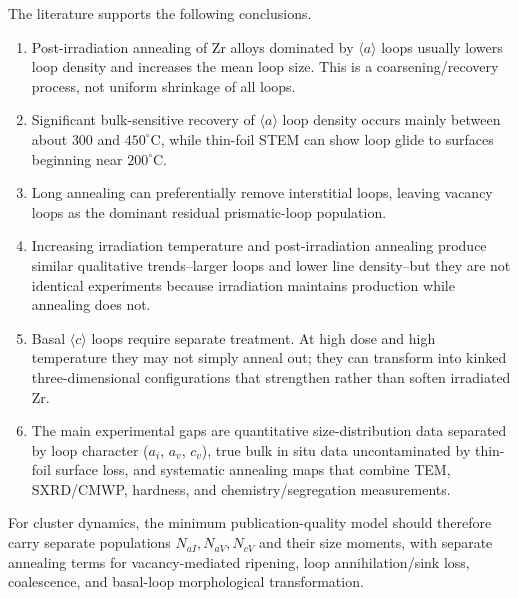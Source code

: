 \documentclass[11pt]{article}
\newcommand{\degreeC}{^\circ\mathrm{C}}
\begin{document}
The literature supports the following conclusions.
\begin{enumerate}[leftmargin=2em]
\item Post-irradiation annealing of Zr alloys dominated by $\langle a\rangle$ loops usually lowers loop density and increases the mean loop size.  This is a coarsening/recovery process, not uniform shrinkage of all loops.
\item Significant bulk-sensitive recovery of $\langle a\rangle$ loop density occurs mainly between about $300$ and $450\degreeC$, while thin-foil STEM can show loop glide to surfaces beginning near $200\degreeC$.
\item Long annealing can preferentially remove interstitial loops, leaving vacancy loops as the dominant residual prismatic-loop population.
\item Increasing irradiation temperature and post-irradiation annealing produce similar qualitative trends--larger loops and lower line density--but they are not identical experiments because irradiation maintains production while annealing does not.
\item Basal $\langle c\rangle$ loops require separate treatment.  At high dose and high temperature they may not simply anneal out; they can transform into kinked three-dimensional configurations that strengthen rather than soften irradiated Zr.
\item The main experimental gaps are quantitative size-distribution data separated by loop character ($a_i$, $a_v$, $c_v$), true bulk in situ data uncontaminated by thin-foil surface loss, and systematic annealing maps that combine TEM, SXRD/CMWP, hardness, and chemistry/segregation measurements.
\end{enumerate}

For cluster dynamics, the minimum publication-quality model should therefore carry separate populations $N_{aI},N_{aV},N_{cV}$ and their size moments, with separate annealing terms for vacancy-mediated ripening, loop annihilation/sink loss, coalescence, and basal-loop morphological transformation.



\end{document}
